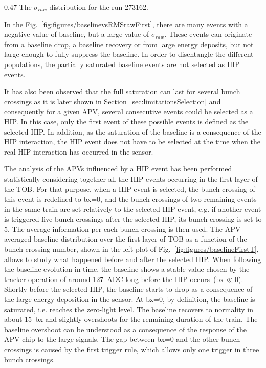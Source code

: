                  {0.47}       %
                 {The $\sigma_{raw}$ distribution for the run 273162. }

In the Fig.~\ref{fig:figures/baselinevsRMSrawFirst}, there are many events with a negative value of baseline, but a large value of $\sigma_{raw}$. These events can originate from a baseline drop, a baseline recovery or from large energy deposits, but not large enough to fully suppress the baseline. In order to  disentangle the different populations, the partially saturated baseline events are not selected as HIP events. 

It has also been observed that the full saturation can last for several bunch crossings as it is later shown in Section~\ref{sec:limitationsSelection} and consequently for a given APV, several consecutive events could be selected as a HIP. In this case, only the first event of these possible events is defined as the selected HIP. In addition, as the saturation of the baseline is a consequence of the HIP interaction, the HIP event does not have to be selected at the time when the real HIP interaction has occurred in the sensor. 


The analysis of the APVs influenced by a HIP event has been performed statistically considering together all the HIP events occurring in the first layer of the TOB. For that purpose, when a HIP event is selected, the bunch crossing of this event is redefined to bx=0, and the bunch crossings of two remaining events in the same train are set relatively to the selected HIP event, e.g. if another event is triggered five bunch crossings after the selected HIP, its bunch crossing is set to 5. The average information per each bunch crossing is then used. The APV-averaged baseline distribution over the first layer of TOB as a function of the bunch crossing number, shown in the left plot of Fig.~\ref{fig:figures/baselineFirstT}, allows to study what happened before and after the selected HIP. When following the baseline evolution in time, the baseline shows a stable value chosen by the tracker operation of around 127~ADC long before the HIP occurs~(bx$\ll$0). Shortly before the selected HIP, the baseline starts to drop as a consequence of the large energy deposition in the sensor. At bx=0, by definition, the baseline is saturated, i.e. reaches the zero-light level. The baseline recovers to normality in about 15~bx and slightly overshoots for the remaining duration of the train. The baseline overshoot can be understood as a consequence of the response of the APV chip to the large signals. The gap between bx=0 and the other bunch crossings is caused by the first trigger rule, which allows only one trigger in three bunch crossings. 

